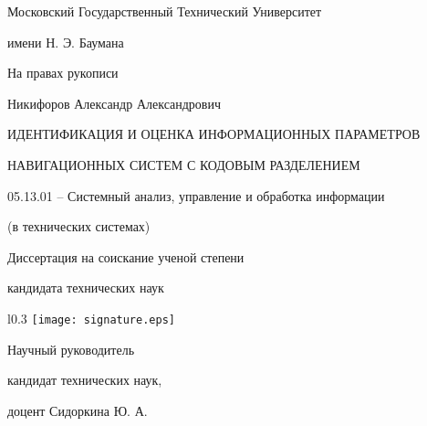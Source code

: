 \noindent\centerline{Московский Государственный Технический Университет}
\noindent\centerline{имени Н. Э. Баумана}
\vspace{\baselineskip}
\vspace{\baselineskip}

\hfill На правах рукописи

\vspace{\baselineskip}
\vspace{\baselineskip}

\noindent\centerline{Никифоров Александр Александрович}

\vspace{\baselineskip}
\vspace{\baselineskip}

\noindent\centerline{ИДЕНТИФИКАЦИЯ И ОЦЕНКА ИНФОРМАЦИОННЫХ ПАРАМЕТРОВ}
\noindent\centerline{НАВИГАЦИОННЫХ СИСТЕМ С КОДОВЫМ РАЗДЕЛЕНИЕМ}

\vspace{\baselineskip}

\noindent\centerline{05.13.01 – Системный анализ, управление и обработка информации}
\noindent\centerline{(в технических системах)}

\vspace{\baselineskip}
\vspace{\baselineskip}

\noindent\centerline{Диссертация на соискание ученой степени}
\noindent\centerline{кандидата технических наук}

\begin{wrapfigure}{l}{0.3\textwidth}
	\vspace*{-3cm}
	\texttt{[image: signature.eps]}
	\vspace*{-2cm}
\end{wrapfigure}

\vspace{\baselineskip}
\vspace{\baselineskip}

\hfill{Научный руководитель}

\hfill{кандидат технических наук,}

\hfill{доцент Сидоркина Ю. А.}

\vfill
\noindent\hspace{1.55cm}{Москва – 2014}

\clearpage
